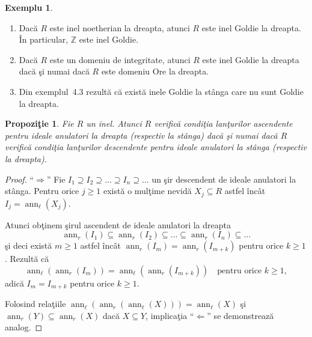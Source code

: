 \documentclass[12pt,a4paper]{book}
\theoremstyle{plain}
\newtheorem{proposition}[theorem]{Propoziţie}
\theoremstyle{definition}
\newtheorem{example}[theorem]{Exemplu}
\theoremstyle{remark}
\begin{document}
\begin{example}
\leavevmode
\begin{enumerate}
  \item Dacă \(R\) este inel noetherian la dreapta, atunci \(R\) este inel
        Goldie la dreapta. În particular, \(\mathbb{Z}\) este inel Goldie.
  \item Dacă \(R\) este un domeniu de integritate, atunci \(R\) este inel
        Goldie la dreapta dacă şi numai dacă \(R\) este domeniu Ore la dreapta.
  \item Din exemplul~4.3 rezultă că există inele Goldie la stânga care nu sunt
        Goldie la dreapta.
\end{enumerate}
\end{example}


\begin{proposition}
Fie \(R\) un inel.
Atunci \(R\) verifică condiţia lanţurilor ascendente pentru ideale
anulatori la dreapta (respectiv la stânga) dacă şi numai dacă
\(R\) verifică condiţia lanţurilor descendente pentru ideale anulatori la stânga (respectiv la dreapta).
\end{proposition}


\begin{proof}
``\(\Rightarrow\)''\;
Fie \(I_1 \supseteq I_2 \supseteq \dots \supseteq I_n \supseteq \dots\) un şir descendent
de ideale anulatori la stânga.
Pentru orice \(j \geq 1\) există o mulţime nevidă \(X_j \subseteq R\) astfel încât
\(I_j = \operatorname{ann}_\ell(X_j)\).

Atunci obţinem şirul ascendent de ideale anulatori la dreapta
\[
  \operatorname{ann}_r(I_1) \subseteq \operatorname{ann}_r(I_2) \subseteq
  \dots \subseteq \operatorname{ann}_r(I_n) \subseteq \dots
\]
şi deci există \(m \geq 1\) astfel încât
\(\operatorname{ann}_r(I_m) = \operatorname{ann}_r(I_{m+k})\) pentru orice \(k \geq 1\).
Rezultă că
\[
  \operatorname{ann}_\ell(\operatorname{ann}_r(I_m))
  = \operatorname{ann}_\ell(\operatorname{ann}_r(I_{m+k}))
  \quad \text{pentru orice } k \geq 1,
\]
adică \(I_m = I_{m+k}\) pentru orice \(k \geq 1\).

Folosind relaţiile
\(\operatorname{ann}_\ell(\operatorname{ann}_r(\operatorname{ann}_\ell(X)))
 = \operatorname{ann}_\ell(X)\) şi
\(\operatorname{ann}_r(Y) \subseteq \operatorname{ann}_r(X)\) dacă \(X \subseteq Y\),
implicaţia ``\(\Leftarrow\)'' se demonstrează analog.
\end{proof}
\end{document}
